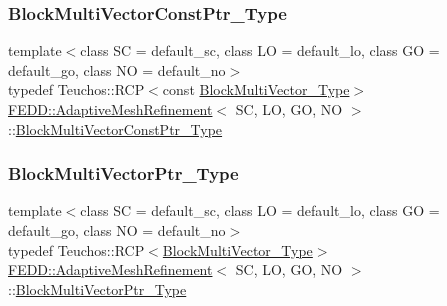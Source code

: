 \subsubsection{\texorpdfstring{Block\+Multi\+Vector\+Const\+Ptr\+\_\+\+Type}{BlockMultiVectorConstPtr\_Type}}
{\footnotesize\ttfamily template$<$class SC = default\+\_\+sc, class LO = default\+\_\+lo, class GO = default\+\_\+go, class NO = default\+\_\+no$>$ \\
typedef Teuchos\+::\+R\+CP$<$const \hyperlink{classFEDD_1_1AdaptiveMeshRefinement_ace60cfe1caf8767564c40edef5ca8b0b}{Block\+Multi\+Vector\+\_\+\+Type}$>$ \hyperlink{classFEDD_1_1AdaptiveMeshRefinement}{F\+E\+D\+D\+::\+Adaptive\+Mesh\+Refinement}$<$ SC, LO, GO, NO $>$\+::\hyperlink{classFEDD_1_1AdaptiveMeshRefinement_a62f59092ab4dee90885c4d38b123ca9c}{Block\+Multi\+Vector\+Const\+Ptr\+\_\+\+Type}}

\mbox{\label{classFEDD_1_1AdaptiveMeshRefinement_aba249beb6c7ef61bd78d2f4ad3be68fe}} 
\subsubsection{\texorpdfstring{Block\+Multi\+Vector\+Ptr\+\_\+\+Type}{BlockMultiVectorPtr\_Type}}
{\footnotesize\ttfamily template$<$class SC = default\+\_\+sc, class LO = default\+\_\+lo, class GO = default\+\_\+go, class NO = default\+\_\+no$>$ \\
typedef Teuchos\+::\+R\+CP$<$\hyperlink{classFEDD_1_1AdaptiveMeshRefinement_ace60cfe1caf8767564c40edef5ca8b0b}{Block\+Multi\+Vector\+\_\+\+Type}$>$ \hyperlink{classFEDD_1_1AdaptiveMeshRefinement}{F\+E\+D\+D\+::\+Adaptive\+Mesh\+Refinement}$<$ SC, LO, GO, NO $>$\+::\hyperlink{classFEDD_1_1AdaptiveMeshRefinement_aba249beb6c7ef61bd78d2f4ad3be68fe}{Block\+Multi\+Vector\+Ptr\+\_\+\+Type}}

\mbox{\label{classFEDD_1_1AdaptiveMeshRefinement_a6bd5089532bd8dac39bebc4a92e33c40}} 
